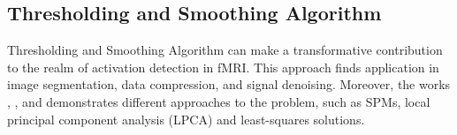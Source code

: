 \subsection{Thresholding and Smoothing Algorithm}

Thresholding and Smoothing Algorithm can make a transformative contribution to the realm of activation detection in fMRI. This approach finds application in image segmentation, data compression, and signal denoising. Moreover, the works \cite{deneux2006using}, \cite{lai1999novel}, and  \cite{orchard2003simultaneous} demonstrates different approaches to the problem, such as SPMs, local principal component analysis (LPCA) and least-squares solutions.


